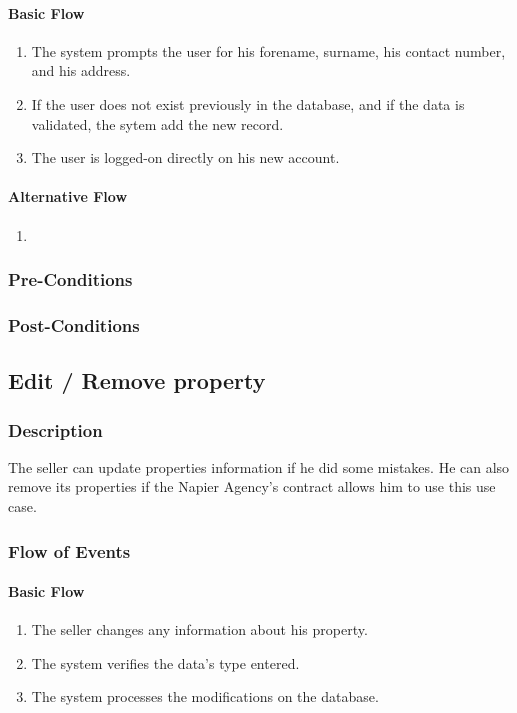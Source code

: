 \documentclass[a4paper,12pt]{article}
\begin{document}
\paragraph{Basic Flow}
\begin{enumerate}
\item The system prompts the user for his forename, surname, his contact number, and his address.
\item If the user does not exist previously in the database, and if the data is validated, the sytem add the new record.
\item The user is logged-on directly on his new account.
\end{enumerate}
\paragraph{Alternative Flow}
\begin{enumerate}
\item
\end{enumerate}
\subsubsection{Pre-Conditions}
\subsubsection{Post-Conditions}

\subsection{Edit / Remove property}
\subsubsection{Description}
The seller can update properties information if he did some mistakes. He can also remove its properties if the Napier Agency's contract allows him to use this use case.
\subsubsection{Flow of Events}
\paragraph{Basic Flow}
\begin{enumerate}
\item The seller changes any information about his property.
\item The system verifies the data's type entered.
\item The system processes the modifications on the database.
\end{enumerate}
\end{document}
